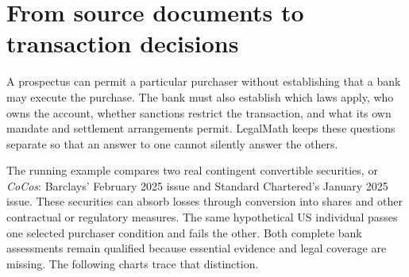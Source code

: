 \chapter*{From source documents to transaction decisions}
\label{map:overview}
\begingroup
{}
\newcommand{\MapSubheading}[1]{\par\vspace{2mm}{\sffamily\bfseries\large #1\par}\vspace{1mm}}
\newcommand{\MapHeading}[2]{\phantomsection\label{#2}\MapSubheading{#1}}
\newenvironment{MapDiagram}{\par\noindent\begin{minipage}{\linewidth}\centering}{\par\end{minipage}\par}
\newcommand{\MapCaption}[1]{\par{\small\itshape #1\par}\vspace{2mm}}

A prospectus can permit a particular purchaser without establishing that a
bank may execute the purchase. The bank must also establish which laws apply,
who owns the account, whether sanctions restrict the transaction, and what its
own mandate and settlement arrangements permit. LegalMath keeps these questions
separate so that an answer to one cannot silently answer the others.

The running example compares two real contingent convertible securities, or
\emph{CoCos}: Barclays' February 2025 issue and Standard Chartered's January
2025 issue. These securities can absorb losses through conversion into shares
and other contractual or regulatory measures. The same hypothetical US
individual passes one selected purchaser condition and fails the other. Both
complete bank assessments remain qualified because essential evidence and
legal coverage are missing. The following charts trace that distinction.

